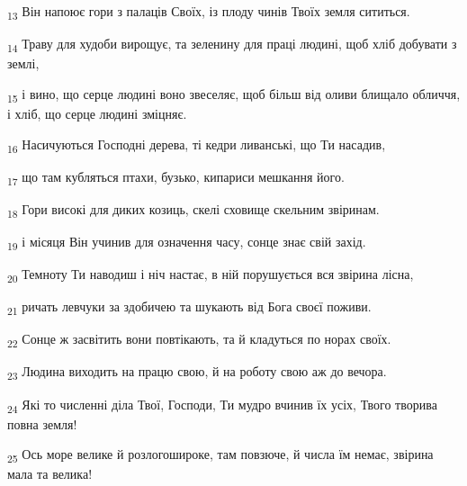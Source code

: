 \begin{tcolorbox}
\textsubscript{13} Він напоює гори з палаців Своїх, із плоду чинів Твоїх земля сититься.
\end{tcolorbox}
\begin{tcolorbox}
\textsubscript{14} Траву для худоби вирощує, та зеленину для праці людині, щоб хліб добувати з землі,
\end{tcolorbox}
\begin{tcolorbox}
\textsubscript{15} і вино, що серце людині воно звеселяє, щоб більш від оливи блищало обличчя, і хліб, що серце людині зміцняє.
\end{tcolorbox}
\begin{tcolorbox}
\textsubscript{16} Насичуються Господні дерева, ті кедри ливанські, що Ти насадив,
\end{tcolorbox}
\begin{tcolorbox}
\textsubscript{17} що там кубляться птахи, бузько, кипариси мешкання його.
\end{tcolorbox}
\begin{tcolorbox}
\textsubscript{18} Гори високі для диких козиць, скелі сховище скельним звіринам.
\end{tcolorbox}
\begin{tcolorbox}
\textsubscript{19} і місяця Він учинив для означення часу, сонце знає свій захід.
\end{tcolorbox}
\begin{tcolorbox}
\textsubscript{20} Темноту Ти наводиш і ніч настає, в ній порушується вся звірина лісна,
\end{tcolorbox}
\begin{tcolorbox}
\textsubscript{21} ричать левчуки за здобичею та шукають від Бога своєї поживи.
\end{tcolorbox}
\begin{tcolorbox}
\textsubscript{22} Сонце ж засвітить вони повтікають, та й кладуться по норах своїх.
\end{tcolorbox}
\begin{tcolorbox}
\textsubscript{23} Людина виходить на працю свою, й на роботу свою аж до вечора.
\end{tcolorbox}
\begin{tcolorbox}
\textsubscript{24} Які то численні діла Твої, Господи, Ти мудро вчинив їх усіх, Твого творива повна земля!
\end{tcolorbox}
\begin{tcolorbox}
\textsubscript{25} Ось море велике й розлогошироке, там повзюче, й числа їм немає, звірина мала та велика!
\end{tcolorbox}
